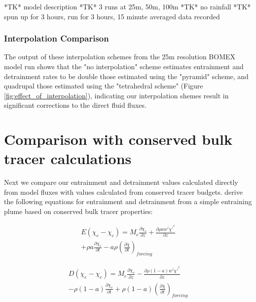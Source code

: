 \documentclass[12pt]{article}
\begin{document}
*TK* model description
*TK* 3 runs at 25m, 50m, 100m
*TK* no rainfall
*TK* spun up for 3 hours, run for 3 hours, 15 minute averaged data recorded

\subsubsection{Interpolation Comparison}

The output of these interpolation schemes from the 25m resolution BOMEX model 
run shows that the "no interpolation" scheme estimates entrainment and 
detrainment rates to be double those estimated using the "pyramid" scheme, and
quadrupal those estimated using the "tetrahedral scheme" (Figure 
\ref{fig:effect_of_interpolation}), indicating our interpolation shemes result 
in significant corrections to the direct fluid fluxes.


\section{Comparison with conserved bulk tracer calculations}

Next we compare our entrainment and detrainment values calculated directly from 
model fluxes with values calculated from conserved tracer budgets.  
\cite{Siebesma1995} derive the following equations for entrainment and 
detrainment from a simple entraining plume based on conserved bulk tracer 
properties:

\begin{equation}
  \label{eq:entrainment}
  \begin{split}
    E (\chi_e - \chi_c) 
    = M_c \frac{\partial \chi_c}{\partial z}
    + \frac{\partial \rho a \overline{w' \chi'}^c}{\partial z} \\
    + \rho a \frac{\partial \chi_c}{\partial t}
    - a \rho \left(\frac{\partial \bar{\chi}}{\partial t}\right)_{forcing}
  \end{split}
\end{equation}

\begin{equation}
  \label{eq:detrainment}
  \begin{split}
    D (\chi_e - \chi_c)
    = M_c \frac{\partial \chi_e}{\partial z}
    - \frac{\partial \rho (1 - a) \overline{w' \chi'}^e}{\partial z} \\
    - \rho (1 - a) \frac{\partial \chi_e}{\partial t}
    + \rho (1 - a) \left(\frac{\partial \bar{\chi}}{\partial t}\right)_{forcing}
  \end{split}
\end{equation}
\end{document}
